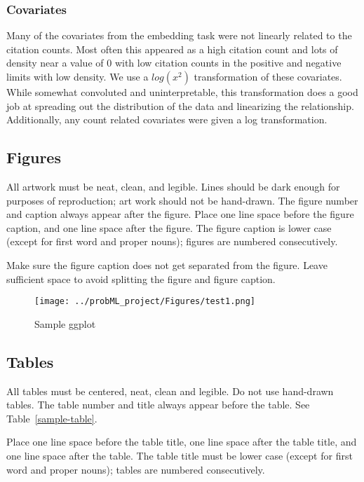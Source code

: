 \documentclass{article} %
\begin{document}
\subsubsection{Covariates}
Many of the covariates from the embedding task were not linearly related to the citation counts. Most often this appeared as a high citation count and lots of density near a value of 0 with low citation counts in the positive and negative limits with low density. We use a $log(x^2)$ transformation of these covariates. While somewhat convoluted and uninterpretable, this transformation does a good job at spreading out the distribution of the data and linearizing the relationship. Additionally, any count related covariates were given a log transformation.




\subsection{Figures}

All artwork must be neat, clean, and legible. Lines should be dark
enough for purposes of reproduction; art work should not be
hand-drawn. The figure number and caption always appear after the
figure. Place one line space before the figure caption, and one line
space after the figure. The figure caption is lower case (except for
first word and proper nouns); figures are numbered consecutively.

Make sure the figure caption does not get separated from the figure.
Leave sufficient space to avoid splitting the figure and figure caption.


\begin{figure}[h]
\begin{center}
\texttt{[image: ../probML\_project/Figures/test1.png]} 
\end{center}
\caption{Sample ggplot}
\end{figure}


\subsection{Tables}

All tables must be centered, neat, clean and legible. Do not use hand-drawn
tables. The table number and title always appear before the table. See
Table~\ref{sample-table}.

Place one line space before the table title, one line space after the table
title, and one line space after the table. The table title must be lower case
(except for first word and proper nouns); tables are numbered consecutively.
\end{document}
